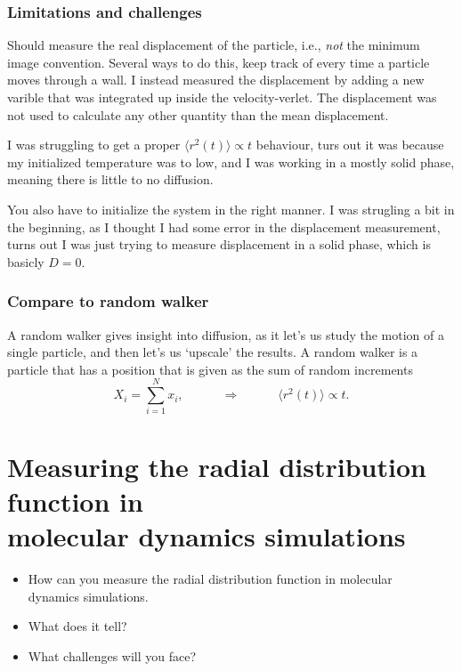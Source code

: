 \documentclass[a4paper, 11pt, notitlepage, english]{article}
\newcommand{\To}{\quad\Rightarrow\quad}
\begin{document}
\subsubsection*{Limitations and challenges}

Should measure the real displacement of the particle, i.e., \emph{not} the minimum image convention. Several ways to do this, keep track of every time a particle moves through a wall. I instead measured the displacement by adding a new varible that was integrated up inside the velocity-verlet. The displacement was not used to calculate any other quantity than the mean displacement.

I was struggling to get a proper $\langle r^2 (t) \rangle \propto t$ behaviour, turs out it was because my initialized temperature was to low, and I was working in a mostly solid phase, meaning there is little to no diffusion.

You also have to initialize the system in the right manner. I was strugling a bit in the beginning, as I thought I had some error in the displacement measurement, turns out I was just trying to measure displacement in a solid phase, which is basicly $D = 0$.

\subsubsection*{Compare to random walker}

A random walker gives insight into diffusion, as it let's us study the motion of a single particle, and then let's us `upscale' the results. A random walker is a particle that has a position that is given as the sum of random increments
$$X_i = \sum_{i=1}^N x_i, \qquad \To \qquad \langle r^2(t) \rangle \propto t.$$


\clearpage



\section{Measuring the radial distribution function in \\ molecular dynamics simulations}
\begin{itemize}
\item How can you measure the radial distribution function in molecular \\ dynamics
simulations.
\item What does it tell?
\item What challenges will you face?
\end{itemize}
\end{document}

